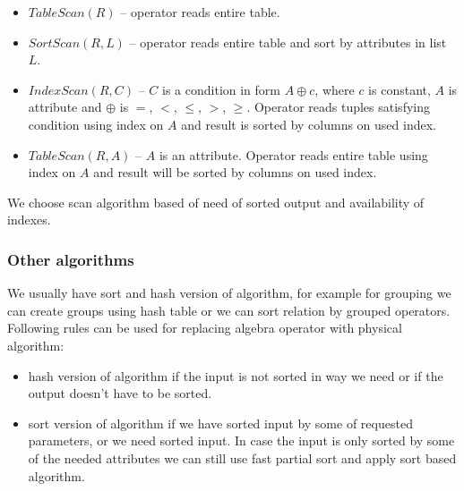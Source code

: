 \begin{itemize}
\item $TableScan(R)$ -- operator reads entire table.

\item $SortScan(R,L)$ -- operator reads entire table and sort by attributes in list~$L$.

\item $IndexScan(R,C)$ -- $C$ is a condition in form $A\oplus c$, where $c$ is constant, $A$ is attribute and $\oplus$ is $=$, $<$, $\leq$, $>$, $\geq$. Operator reads tuples satisfying condition using index on $A$ and result is sorted by columns on used index.

\item $TableScan(R,A)$ -- $A$ is an attribute. Operator reads entire table using index on $A$ and result will be sorted by columns on used index.

\end{itemize}

We choose scan algorithm based of need of sorted output and availability of indexes.

\subsubsection{Other algorithms}

We usually have sort and hash version of algorithm, for example for grouping we can create groups using hash table or we can sort relation by grouped operators. Following rules can be used for replacing algebra operator with physical algorithm:

\begin{itemize}
\item hash version of algorithm if the input is not sorted in way we need or if the output doesn't have to be sorted.

\item sort version of algorithm if we have sorted input by some of requested parameters, or we need sorted input. In case the input is only sorted by some of the needed attributes we can still use fast partial sort and apply sort based algorithm.

\end{itemize}